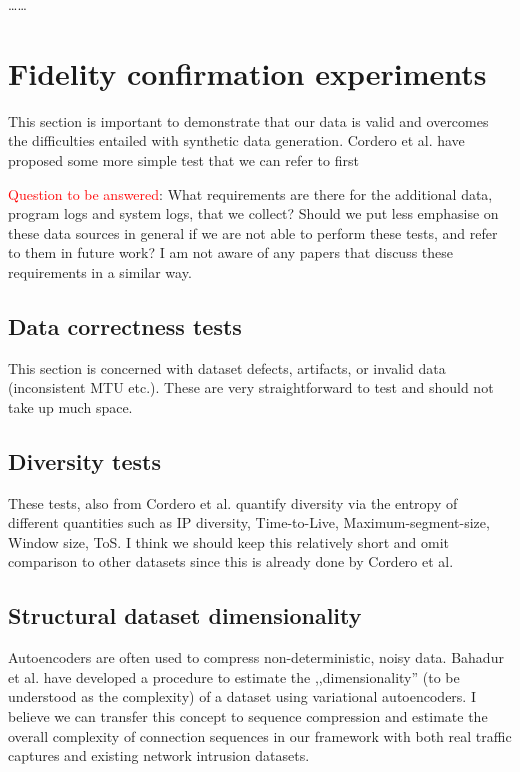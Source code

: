 \documentclass{article}
\begin{document}
\dots \dots


\section{Fidelity confirmation experiments}\label{Sec:Experiments}

This section is important to demonstrate that our data is valid and overcomes the difficulties entailed with synthetic data generation. Cordero et al. have proposed some more simple test that we can refer to first

\textcolor{red}{Question to be answered}: What requirements are there for the additional data, program logs and system logs, that we collect? Should we put less emphasise on these data sources in general if we are not able to perform these tests, and refer to them in future work? I am not aware of any papers that discuss these requirements in a similar way. 


\subsection{Data correctness tests}

This section is concerned with dataset defects, artifacts, or invalid data (inconsistent MTU etc.). These are very straightforward to test and should not take up much space. 


\subsection{Diversity tests}

These tests, also from Cordero et al. quantify diversity via the entropy of different quantities such as IP diversity, Time-to-Live, Maximum-segment-size, Window size, ToS. I think we should keep this relatively short and omit comparison to other datasets since this is already done by Cordero et al. 


\subsection{Structural dataset dimensionality}



Autoencoders are often used to compress non-deterministic, noisy data. Bahadur et al. have developed a procedure to estimate the ,,dimensionality'' (to be understood as the complexity) of a dataset using variational autoencoders. I believe we can transfer this concept to sequence compression and estimate the overall complexity of connection sequences in our framework with both real traffic captures and existing network intrusion datasets. 
\end{document}
